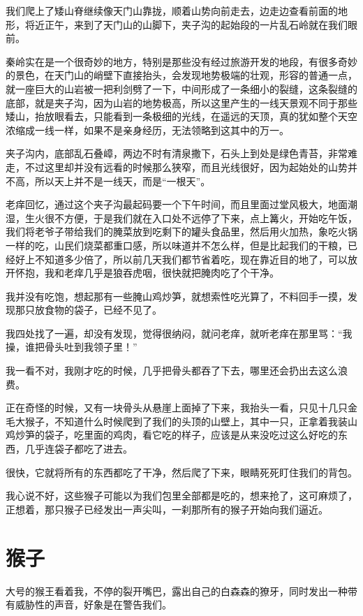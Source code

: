 我们爬上了矮山脊继续像天门山靠拢，顺着山势向前走去，边走边查看前面的地形，将近正午，来到了天门山的山脚下，夹子沟的起始段的一片乱石岭就在我们眼前。

秦岭实在是一个很奇妙的地方，特别是那些没有经过旅游开发的地段，有很多奇妙的景色，在天门山的峭壁下直接抬头，会发现地势极端的壮观，形容的普通一点，就一座巨大的山岩被一把利剑劈了一下，中间形成了一条细小的裂缝，这条裂缝的底部，就是夹子沟，因为山岩的地势极高，所以这里产生的一线天景观不同于那些矮山，抬放眼看去，只能看到一条极细的光线，在遥远的天顶，真的犹如整个天空浓缩成一线一样，如果不是亲身经历，无法领略到这其中的万一。

夹子沟内，底部乱石叠嶂，两边不时有清泉撒下，石头上到处是绿色青苔，非常难走，不过这里却并没有远看的时候那么狭窄，而且光线很好，因为起始处的山势并不高，所以天上并不是一线天，而是“一根天”。

老痒回忆，通过这个夹子沟最起码要一个下午时间，而且里面过堂风极大，地面潮湿，生火很不方便，于是我们就在入口处不远停了下来，点上篝火，开始吃午饭，我们将老爷子带给我们的腌菜放到吃剩下的罐头食品里，然后用火加热，象吃火锅一样的吃，山民们烧菜都重口感，所以味道并不怎么样，但是比起我们的干粮，已经好上不知道多少倍了，所以前几天我们都节省着吃，现在靠近目的地了，可以放开怀抱，我和老痒几乎是狼吞虎咽，很快就把腌肉吃了个干净。

我并没有吃饱，想起那有一些腌山鸡炒笋，就想索性吃光算了，不料回手一摸，发现那只放食物的袋子，已经不见了。

我四处找了一遍，却没有发现，觉得很纳闷，就问老痒，就听老痒在那里骂：“我操，谁把骨头吐到我领子里！”

我一看不对，我刚才吃的时候，几乎把骨头都吞了下去，哪里还会扔出去这么浪费。

正在奇怪的时候，又有一块骨头从悬崖上面掉了下来，我抬头一看，只见十几只金毛大猴子，不知道什么时候爬到了我们的头顶的山壁上，其中一只，正拿着我装山鸡炒笋的袋子，吃里面的鸡肉，看它吃的样子，应该是从来没吃过这么好吃的东西，几乎连袋子都吃了进去。

很快，它就将所有的东西都吃了干净，然后爬了下来，眼睛死死盯住我们的背包。

我心说不好，这些猴子可能以为我们包里全部都是吃的，想来抢了，这可麻烦了，正想着，那只猴子已经发出一声尖叫，一刹那所有的猴子开始向我们逼近。

\chapter{猴子}

大号的猴王看着我，不停的裂开嘴巴，露出自己的白森森的獠牙，同时发出一种带有威胁性的声音，好象是在警告我们。

